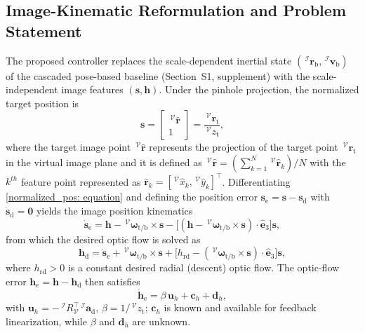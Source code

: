 \subsection{Image-Kinematic Reformulation and Problem Statement} \label{problem statement: section}
The proposed controller replaces the scale-dependent inertial state $(\,^\mathcal{I}\boldsymbol{r}_\text{b},\,^\mathcal{I}\boldsymbol{v}_\text{b})$ of the cascaded pose-based baseline (Section~S1, supplement) with the scale-independent image features $(\boldsymbol{s},\boldsymbol{h})$. Under the pinhole projection, the normalized target position is
\begin{equation} \label{normalized_pos: equation}
    \boldsymbol{s} = \begin{bmatrix}\,^\mathcal{V}\hat{\boldsymbol{r}}\\ 1\end{bmatrix} = \frac{\,^\mathcal{V}\boldsymbol{r}_\text{t}}{\,^\mathcal{V}z_\text{t}},
\end{equation}
where the target image point $\,^\mathcal{V}\boldsymbol{\hat{r}}$ represents the projection of the target point $\,^\mathcal{V}\boldsymbol{r}_{\text{t}}$ in the virtual image plane and it is defined as $\,^\mathcal{V}\boldsymbol{\hat{r}} = \left(\sum^{N}_{k=1} \,^\mathcal{V}\boldsymbol{\hat{r}}_k \right)/N$ with the $k^{th}$ feature point represented as $\boldsymbol{\hat{r}}_k = [\,^\mathcal{V}\hat{x}_k, \,^\mathcal{V}\hat{y}_k]^{\top}$.
Differentiating \eqref{normalized_pos: equation} and defining the position error $\boldsymbol{s}_\text{e}=\boldsymbol{s}-\boldsymbol{s}_\text{d}$ with $\dot{\boldsymbol{s}}_\text{d}=\boldsymbol{0}$ yields the image position kinematics
\begin{equation} \label{s_e_dot: equation}
    \dot{\boldsymbol{s}}_\text{e} = \boldsymbol{h} - \,^\mathcal{V}\boldsymbol{\omega}_\text{t/b}\times\boldsymbol{s} - \big[(\boldsymbol{h}-\,^\mathcal{V}\boldsymbol{\omega}_\text{t/b}\times\boldsymbol{s})\cdot\hat{\boldsymbol{e}}_3\big]\boldsymbol{s},
\end{equation}
from which the desired optic flow is solved as
\begin{equation} \label{h_des: equation}
    \boldsymbol{h}_\text{d} = \dot{\boldsymbol{s}}_\text{e} + \,^\mathcal{V}\boldsymbol{\omega}_\text{t/b}\times\boldsymbol{s} + \big[h_\text{rd} - (\,^\mathcal{V}\boldsymbol{\omega}_\text{t/b}\times\boldsymbol{s})\cdot\hat{\boldsymbol{e}}_3\big]\boldsymbol{s},
\end{equation}
where $h_\text{rd}>0$ is a constant desired radial (descent) optic flow. The optic-flow error $\boldsymbol{h}_\text{e}=\boldsymbol{h}-\boldsymbol{h}_\text{d}$ then satisfies
\begin{equation} \label{h_e_dot_1: equation}
    \dot{\boldsymbol{h}}_\text{e} = \beta\,\boldsymbol{u}_h + \boldsymbol{c}_h + \boldsymbol{d}_h,
\end{equation}
with $\boldsymbol{u}_h=-\,^\mathcal{I}R_\mathcal{V}^\top\,^\mathcal{I}\boldsymbol{a}_\text{d}$, $\beta=1/\,^\mathcal{V}z_\text{t}$; $\boldsymbol{c}_h$ is known and available for feedback linearization, while $\beta$ and $\boldsymbol{d}_h$ are unknown.

